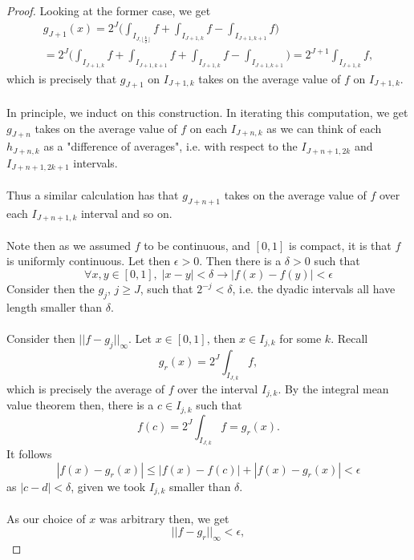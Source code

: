 \documentclass[12pt]{article}
\newenvironment{ex}[2][Exercise]{\begin{trivlist}
\item[\hskip \labelsep {\bfseries #1}\hskip \labelsep {\bfseries #2.}]}{\end{trivlist}}
\begin{document}
\begin{ex}{14}
\begin{enumerate}
\begin{proof}
            Looking at the former case, we get 
            \begin{align*}g_{J + 1}(x) = 2^J \Big (\int_{I_{J, \lfloor \frac{k}{2} \rfloor}} f + \int_{I_{J + 1, k}} f - \int_{I_{J + 1, k + 1}} f \Big) \\
                 = 2^J \Big (\int_{I_{J + 1, k}} f + \int_{I_{J + 1, k + 1}} f + \int_{I_{J + 1, k}} f - \int_{I_{J + 1, k + 1}} \Big) = 2^{J + 1}\int_{I_{J + 1, k}} f,
            \end{align*}
            which is precisely that $g_{J + 1}$ on $I_{J + 1,k}$ takes on the average value of $f$ on $I_{J + 1, k}$. \\ \\
            In principle, we induct on this construction. In iterating this computation, we get $g_{J + n}$ takes on the average value of $f$ on each $I_{J + n, k}$ as we can think of each $h_{J + n, k}$ as a "difference of averages", i.e. with respect to the $I_{J + n + 1, 2k}$ and $I_{J + n + 1, 2k + 1}$ intervals. \\ \\
            Thus a similar calculation has that $g_{J + n + 1}$ takes on the average value of $f$ over each $I_{J + n + 1, k}$ interval and so on. \\ \\
            Note then as we assumed $f$ to be continuous, and $[0,1]$ is compact, it is that $f$ is uniformly continuous. Let then $\epsilon > 0$. Then there is a $\delta > 0$ such that 
            $$\forall x, y \in [0,1], \; |x - y| < \delta \longrightarrow |f(x) - f(y)| < \epsilon$$
            Consider then the $g_j$, $j \geq J$, such that $2^{-j} < \delta$, i.e. the dyadic intervals all have length smaller than $\delta$. \\ \\
            Consider then $||f - g_j||_\infty$. Let $x \in [0,1]$, then $x \in I_{j, k}$ for some $k$. Recall
            $$g_r(x) = 2^J \int_{I_{J, k}} f,$$
            which is precisely the average of $f$ over the interval $I_{j,k}$. By the integral mean value theorem then, there is a $c \in I_{j, k}$ such that 
            $$f(c) = 2^J \int_{I_{J, k}} f = g_r(x).$$
            It follows
            $$|f(x) - g_r(x)| \leq |f(x) - f(c)| + |f(x) - g_r(x)| < \epsilon$$
            as $|c - d| < \delta$, given we took $I_{j,k}$ smaller than $\delta$. \\ \\
            As our choice of $x$ was arbitrary then, we get 
            $$||f - g_r||_\infty < \epsilon,$$

\end{proof}
\end{enumerate}
\end{ex}
\end{document}
